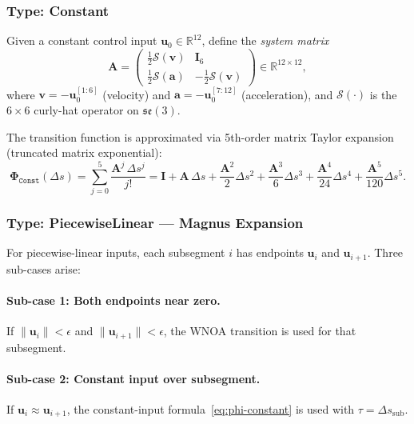 \documentclass[11pt,a4paper]{article}
\newcommand{\se}{\mathfrak{se}(3)}
\newcommand{\curly}[1]{\mathcal{S}\!\left(#1\right)}
\newcommand{\R}{\mathbb{R}}
\newcommand{\bPhi}{\bm{\Phi}}
\newcommand{\bA}{\mathbf{A}}
\newcommand{\bI}{\mathbf{I}}
\begin{document}
\subsubsection{Type: Constant}
\label{sec:phi-constant}
Given a constant control input $\mathbf{u}_0 \in \R^{12}$, define the \emph{system matrix}
\begin{equation}
    \bA = \begin{pmatrix} \tfrac{1}{2}\curly{\mathbf{v}} & \bI_6 \\ \tfrac{1}{2}\curly{\mathbf{a}} & -\tfrac{1}{2}\curly{\mathbf{v}} \end{pmatrix} \in \R^{12 \times 12},
    \label{eq:A-constant}
\end{equation}
where $\mathbf{v} = -\mathbf{u}_0^{[1:6]}$ (velocity) and $\mathbf{a} = -\mathbf{u}_0^{[7:12]}$ (acceleration), and $\curly{\cdot}$ is the $6{\times}6$ curly-hat operator on $\se$.

The transition function is approximated via 5th-order matrix Taylor expansion (truncated matrix exponential):
\begin{equation}
    \bPhi_{\texttt{Const}}(\Delta s) = \sum_{j=0}^{5} \frac{\bA^j\,\Delta s^j}{j!} = \bI + \bA\,\Delta s + \frac{\bA^2}{2}\Delta s^2 + \frac{\bA^3}{6}\Delta s^3 + \frac{\bA^4}{24}\Delta s^4 + \frac{\bA^5}{120}\Delta s^5.
    \label{eq:phi-constant}
\end{equation}

\subsubsection{Type: PiecewiseLinear --- Magnus Expansion}
\label{sec:phi-pwl}

For piecewise-linear inputs, each subsegment $i$ has endpoints $\mathbf{u}_i$ and $\mathbf{u}_{i+1}$.
Three sub-cases arise:

\paragraph{Sub-case 1: Both endpoints near zero.}
If $\|\mathbf{u}_i\| < \epsilon$ and $\|\mathbf{u}_{i+1}\| < \epsilon$, the WNOA transition is used for that subsegment.

\paragraph{Sub-case 2: Constant input over subsegment.}
If $\mathbf{u}_i \approx \mathbf{u}_{i+1}$, the constant-input formula~\eqref{eq:phi-constant} is used with $\tau = \Delta s_{\mathrm{sub}}$.
\end{document}
